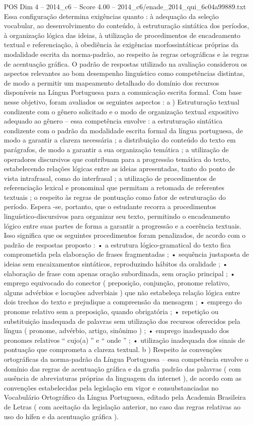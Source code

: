 \begin{textsample}{POS Dim 4 – 2014\_c6 – Score 4.00 – 2014\_c6/enade\_2014\_qui\_6c04a99889.txt}
Essa configuração determina exigências quanto : à adequação da seleção vocabular, ao desenvolvimento do conteúdo, à estruturação sintática dos períodos, à organização lógica das ideias, à utilização de procedimentos de encadeamento textual e referenciação, à obediência às exigências morfossintáticas próprias da modalidade escrita da norma-padrão, ao respeito às regras ortográficas e às regras de acentuação gráfica.
O padrão de respostas utilizado na avaliação considerou os aspectos relevantes ao bom desempenho linguístico como competências distintas, de modo a permitir um mapeamento detalhado do domínio dos recursos disponíveis na Língua Portuguesa para a comunicação escrita formal.
Com base nesse objetivo, foram avaliados os seguintes aspectos : a ) Estruturação textual condizente com o gênero solicitado e o modo de organização textual expositivo adequado ao gênero – essa competência envolve : a estruturação sintática condizente com o padrão da modalidade escrita formal da língua portuguesa, de modo a garantir a clareza necessária ; a distribuição do conteúdo do texto em parágrafos, de modo a garantir a sua organização temática ; a utilização de operadores discursivos que contribuam para a progressão temática do texto, estabelecendo relações lógicas entre as ideias apresentadas, tanto do ponto de vista intrafrasal, como do interfrasal ; a utilização de procedimentos de referenciação lexical e pronominal que permitam a retomada de referentes textuais ; o respeito às regras de pontuação como fator de estruturação do período.
Espera -se, portanto, que o estudante recorra a procedimentos linguístico-discursivos para organizar seu texto, permitindo o encadeamento lógico entre suas partes de forma a garantir a progressão e a coerência textuais.
Isso significa que os seguintes procedimentos foram penalizados, de acordo com o padrão de respostas proposto : • a estrutura lógico-gramatical do texto fica comprometida pela elaboração de frases fragmentadas ; • sequência justaposta de ideias sem encaixamentos sintáticos, reproduzindo hábitos da oralidade ; • elaboração de frase com apenas oração subordinada, sem oração principal ; • emprego equivocado do conector ( preposição, conjunção, pronome relativo, alguns advérbios e locuções adverbiais ) que não estabeleça relação lógica entre dois trechos do texto e prejudique a compreensão da mensagem ; • emprego do pronome relativo sem a preposição, quando obrigatória ; • repetição ou substituição inadequada de palavras sem utilização dos recursos oferecidos pela língua ( pronome, advérbio, artigo, sinônimo ) ; • emprego inadequado dos pronomes relativos “ cujo(a) ” e “ onde ” ; • utilização inadequada dos sinais de pontuação que comprometa a clareza textual. b ) Respeito às convenções ortográficas da norma-padrão da Língua Portuguesa – essa competência envolve o domínio das regras de acentuação gráfica e da grafia padrão das palavras ( com ausência de abreviaturas próprias da linguagem da internet ), de acordo com as convenções estabelecidas pela legislação em vigor e consubstanciadas no Vocabulário Ortográfico da Língua Portuguesa, editado pela Academia Brasileira de Letras ( com aceitação da legislação anterior, no caso das regras relativas ao uso do hífen e da acentuação gráfica ).

\end{textsample}
